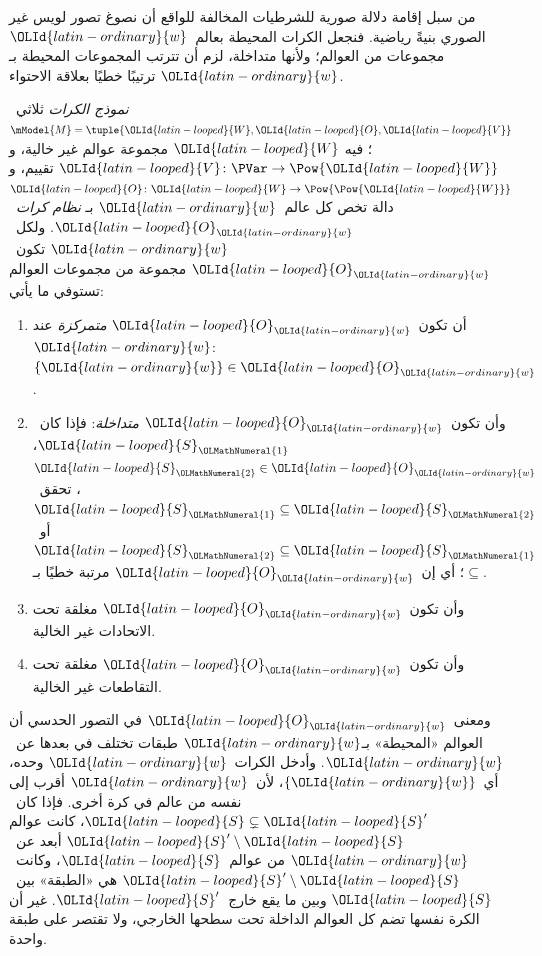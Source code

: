 \documentclass[../../../include/open-logic-section]{subfiles}
\begin{document}


من سبل إقامة دلالة صورية للشرطيات المخالفة للواقع أن نصوغ تصور لويس
غير الصوري بنيةً رياضية. فنجعل الكرات المحيطة بعالم~$\OLId{latin-ordinary}{w}$ مجموعات من
العوالم؛ ولأنها متداخلة، لزم أن تترتب المجموعات المحيطة بـ$\OLId{latin-ordinary}{w}$ ترتيبًا
خطيًا بعلاقة الاحتواء.

\begin{defn}
  \emph{نموذج الكرات} ثلاثي~$\mModel{M} = \tuple{\OLId{latin-looped}{W}, \OLId{latin-looped}{O}, \OLId{latin-looped}{V}}$؛ فيه
  $\OLId{latin-looped}{W}$ مجموعة عوالم غير خالية، و$\OLId{latin-looped}{V}\colon \PVar \to \Pow{\OLId{latin-looped}{W}}$ تقييم،
  و$\OLId{latin-looped}{O}\colon \OLId{latin-looped}{W} \to \Pow{\Pow{\OLId{latin-looped}{W}}}$ دالة تخص كل عالم~$\OLId{latin-ordinary}{w}$ بـ
  \emph{نظام كرات}~$\OLId{latin-looped}{O}_\OLId{latin-ordinary}{w}$. ولكل~$\OLId{latin-ordinary}{w}$ تكون~$\OLId{latin-looped}{O}_\OLId{latin-ordinary}{w}$ مجموعة من مجموعات
  العوالم تستوفي ما يأتي:
  \begin{enumerate}
  \item أن تكون~$\OLId{latin-looped}{O}_\OLId{latin-ordinary}{w}$ \emph{متمركزة} عند~$\OLId{latin-ordinary}{w}$: $\{\OLId{latin-ordinary}{w}\} \in \OLId{latin-looped}{O}_\OLId{latin-ordinary}{w}$.
  \item وأن تكون~$\OLId{latin-looped}{O}_\OLId{latin-ordinary}{w}$ \emph{متداخلة}: فإذا كان~$\OLId{latin-looped}{S}_\OLMathNumeral{1}$، $\OLId{latin-looped}{S}_\OLMathNumeral{2} \in \OLId{latin-looped}{O}_\OLId{latin-ordinary}{w}$،
    تحقق~$\OLId{latin-looped}{S}_\OLMathNumeral{1} \subseteq \OLId{latin-looped}{S}_\OLMathNumeral{2}$ أو~$\OLId{latin-looped}{S}_\OLMathNumeral{2} \subseteq \OLId{latin-looped}{S}_\OLMathNumeral{1}$؛ أي إن~$\OLId{latin-looped}{O}_\OLId{latin-ordinary}{w}$
    مرتبة خطيًا بـ$\subseteq$.
  \item وأن تكون~$\OLId{latin-looped}{O}_\OLId{latin-ordinary}{w}$ مغلقة تحت الاتحادات غير الخالية.
  \item وأن تكون~$\OLId{latin-looped}{O}_\OLId{latin-ordinary}{w}$ مغلقة تحت التقاطعات غير الخالية.
  \end{enumerate}
\end{defn}

ومعنى~$\OLId{latin-looped}{O}_\OLId{latin-ordinary}{w}$ في التصور الحدسي أن العوالم «المحيطة» بـ$\OLId{latin-ordinary}{w}$ طبقات تختلف
في بعدها عن~$\OLId{latin-ordinary}{w}$. وأدخل الكرات~$\OLId{latin-ordinary}{w}$ وحده، أي~$\{\OLId{latin-ordinary}{w}\}$، لأن~$\OLId{latin-ordinary}{w}$ أقرب إلى
نفسه من عالم في كرة أخرى. فإذا كان~$\OLId{latin-looped}{S} \subsetneq \OLId{latin-looped}{S}'$، كانت عوالم
$\OLId{latin-looped}{S}' \setminus \OLId{latin-looped}{S}$ أبعد عن~$\OLId{latin-ordinary}{w}$ من عوالم~$\OLId{latin-looped}{S}$، وكانت~$\OLId{latin-looped}{S}' \setminus \OLId{latin-looped}{S}$
هي «الطبقة» بين~$\OLId{latin-looped}{S}$ وبين ما يقع خارج~$\OLId{latin-looped}{S}'$. غير أن الكرة نفسها تضم كل
العوالم الداخلة تحت سطحها الخارجي، ولا تقتصر على طبقة واحدة.
\end{document}
